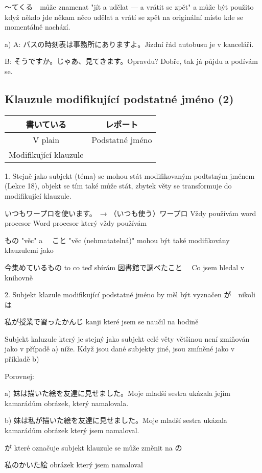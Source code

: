 〜てくる　může znamenat "jít a udělat --- a vrátit se zpět" a může být použito když někdo jde někam něco udělat a vrátí se zpět na originální místo kde se momentálně nachází.

a)
A: バスの時刻表は事務所にありますよ。Jízdní řád autobusu je v kanceláři.

B: そうですか。じゃあ、見てきます。Opravdu? Dobře, tak já půjdu a podívám se.

\subsection{Klauzule modifikující podstatné jméno (2)}

\begin{tabular}{|c|c|}
書いている　&レポート\\
\hline
V plain&Podstatné jméno\\
Modifikující klauzule&\\
\hline
\end{tabular}

1. Stejně jako subjekt (téma) se mohou stát modifikovaným podtstným jménem (Lekce 18), objekt se tím také může stát, zbytek věty se transformuje do modifikující klauzule.

いつもワープロを使います。　→         （いつも使う）ワープロ
Vždy používám word procesor			Word procesor který vždy používám


もの "věc" a 　こと "věc (nehmatatelná)" mohou být také modifikovány klauzulemi jako 

今集めているもの to co teď sbírám
図書館で調べたこと　 Co jsem hledal v knihovně

2. Subjekt klazule modifikující podstatné jméno by měl být vyznačen が　nikoli は

私が授業で習ったかんじ kanji které jsem se naučil na hodině

Subjekt kaluzule který je stejný jako subjekt celé věty většinou není zmiňován jako v případě a) níže. Když jsou dané subjekty jiné, jsou zmíněné jako v příkladě b)

Porovnej:

a) 妹は描いた絵を友達に見せました。Moje mladší sestra ukázala jejím kamarádům obrázek, který namalovala.

b) 妹は私が描いた絵を友達に見せました。Moje mladší sestra ukázala kamarádům obrázek který jsem namaloval.

が které označuje subjekt klauzule se může změnit na の

私のかいた絵 obrázek který jsem namaloval

